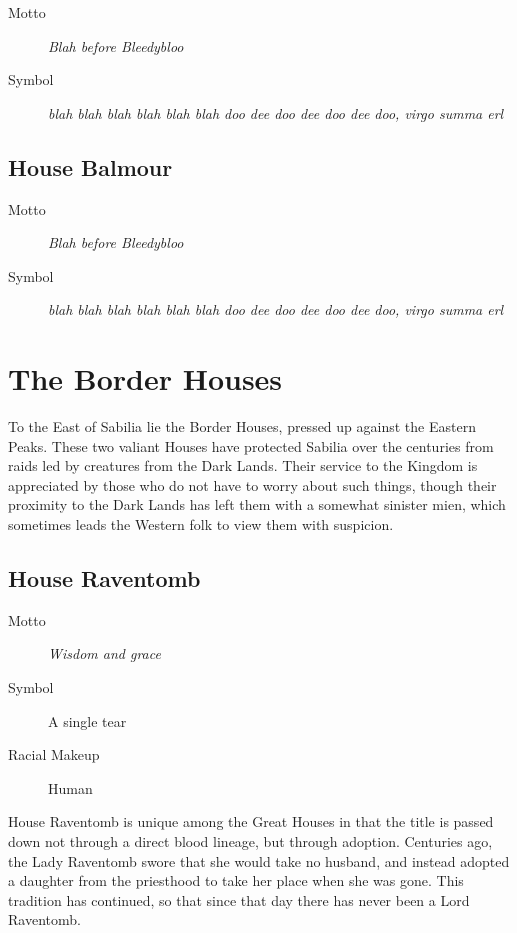 \documentclass[10pt,twoside,openright,a4paper,twocolumn]{book}
\begin{document}
\begin{description}
\item[Motto] \textit{Blah before Bleedybloo}

\item[Symbol] \textit{blah blah blah blah blah blah
doo dee doo dee doo dee doo, virgo summa erl}
\end{description}

\lipsum[1]

\subsection*{House Balmour}

\begin{description}
\item[Motto] \textit{Blah before Bleedybloo}

\item[Symbol] \textit{blah blah blah blah blah blah
doo dee doo dee doo dee doo, virgo summa erl}
\end{description}

\lipsum[1]

\section{The Border Houses}

To the East of Sabilia lie the Border Houses, pressed up against the Eastern
Peaks.  These two valiant Houses have protected Sabilia over the centuries from
raids led by creatures from the Dark Lands.  Their service to the Kingdom is
appreciated by those who do not have to worry about such things, though their
proximity to the Dark Lands has left them with a somewhat sinister mien, which
sometimes leads the Western folk to view them with suspicion.

\subsection*{House Raventomb}

\begin{description}
\item[Motto] \textit{Wisdom and grace}

\item[Symbol] A single tear

\item[Racial Makeup] Human
\end{description}

\noindent
House Raventomb is unique among the Great Houses in that the title is passed
down not through a direct blood lineage, but through adoption.  Centuries ago,
the Lady Raventomb swore that she would take no husband, and instead adopted
a daughter from the priesthood to take her place when she was gone.  This
tradition has continued, so that since that day there has never been a Lord
Raventomb.
\end{document}
